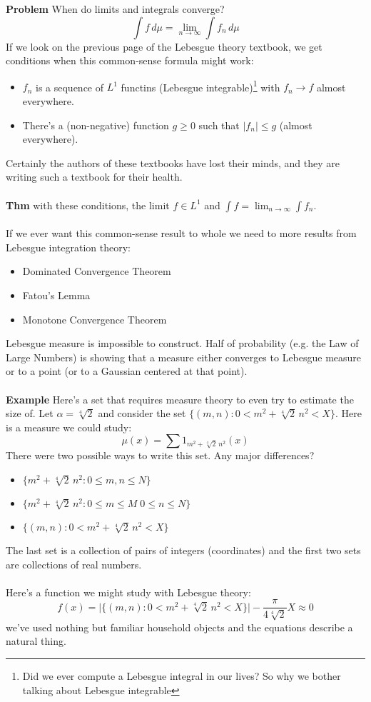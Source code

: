 \documentclass[12pt]{article}
\begin{document}
\noindent \textbf{Problem}  When do limits and integrals converge?
$$ \int f \, d\mu= \lim_{n \to \infty} \int f_n  \, d\mu $$
If we look on the previous page of the Lebesgue theory textbook, we get conditions when this common-sense formula might work:
\begin{itemize}
\item $f_n$ is a sequence of $L^1$ functins (Lebesgue integrable)\footnote{Did we ever compute a Lebesgue integral in our lives?  So why we bother talking about Lebesgue integrable} with $f_n \to f$ almost everywhere.
\item There's a (non-negative) function $g \geq 0$ such that $|f_n| \leq g$ (almost everywhere).
\end{itemize}
Certainly the authors of these textbooks have lost their minds, and they are writing such a textbook for their health. \\ \\
\textbf{Thm} with these conditions, the limit $f \in L^1$ and $\int f = \lim_{n \to \infty} \int f_n$. \\ \\
If we ever want this common-sense result to whole we need to more results from Lebesgue integration theory:
\begin{itemize}
\item Dominated Convergence Theorem
\item Fatou's Lemma
\item Monotone Convergence Theorem
\end{itemize}
Lebesgue measure is impossible to construct.  Half of probability (e.g. the Law of Large Numbers) is showing that a measure either converges to Lebesgue measure or to a point (or to a Gaussian centered at that point). \\ \\
\textbf{Example} Here's a set that requires measure theory to even try to estimate the size of.  Let $\alpha = \sqrt[4]{2}$ and consider the set $\{ (m,n) : 0 < m^2 + \sqrt[4]{2} \, n^2 < X \} $.  Here is a measure we could study:
$$ \mu(x) = \sum 1_{m^2 + \sqrt[4]{2}\,
n^2}(x) $$
There were two possible ways to write this set.  Any major differences?
\begin{itemize}
\item $\{ m^2 + \sqrt[4]{2}\,n^2 : 0 \leq m,n \leq N \}$
\item $\{ m^2 + \sqrt[4]{2}\,n^2 : 0 \leq m \leq M \; 0 \leq n \leq N \}$
\item $\{ (m,n) : 0 < m^2 + \sqrt[4]{2} \, n^2 < X \} $
\end{itemize}
The last set is a collection of pairs of integers (coordinates) and the first two sets are collections of real numbers. \\ \\
Here's a function we might study with Lebesgue theory:
$$ f(x) = \big| \{ (m,n) : 0 < m^2 + \sqrt[4]{2} \, n^2 < X \} \big| - \frac{\pi}{4\sqrt[4]{2}} X \approx 0$$
we've used nothing but familiar household objects and the equations describe a natural thing.
\end{document}
